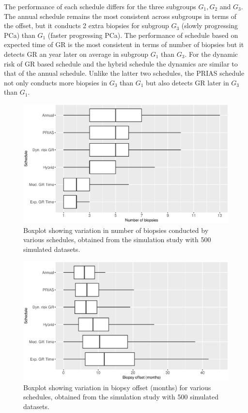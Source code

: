 The performance of each schedule differs for the three subgroups $G_1, G_2$ and $G_3$. The annual schedule remains the most consistent across subgroups in terms of the offset, but it conducts 2 extra biopsies for subgroup $G_3$ (slowly progressing PCa) than $G_1$ (faster progressing PCa). The performance of schedule based on expected time of GR is the most consistent in terms of number of biopsies but it detects GR an year later on average in subgroup $G_1$ than $G_3$. For the dynamic risk of GR based schedule and the hybrid schedule the dynamics are similar to that of the annual schedule. Unlike the latter two schedules, the PRIAS schedule not only conducts more biopsies in $G_3$ than $G_1$ but also detects GR later in $G_3$ than $G_1$.

\begin{figure}[!htb]
\centerline{\includegraphics[width=\columnwidth]{images/sim_study/nbBoxPlot_all.eps}}
\caption{Boxplot showing variation in number of biopsies conducted by various schedules, obtained from the simulation study with 500 simulated datasets.}
\label{fig : nbBoxPlot_all}
\end{figure}

\begin{figure}[!htb]
\centerline{\includegraphics[width=\columnwidth]{images/sim_study/offsetBoxPlot_all.eps}}
\caption{Boxplot showing variation in biopsy offset (months) for various schedules, obtained from the simulation study with 500 simulated datasets.}
\label{fig : offsetBoxPlot_all}
\end{figure}

